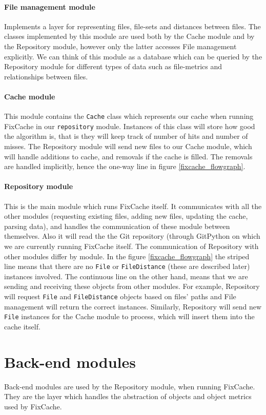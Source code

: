 \documentclass[12pt,twoside,notitlepage]{report}
\newcommand{\fxch}{FixCache}
\begin{document}
\paragraph{File management module}Implements a layer for representing files, file-sets and distances between files. The classes implemented by this module are used both by the Cache module and by the Repository module, however only the latter accesses File management explicitly. We can think of this module as a database which can be queried by the Repository module for different types of data such as file-metrics and relationships between files.

\paragraph{Cache module}This module contains the \texttt{Cache} class which represents our cache when running \fxch{} in our \texttt{repository} module. Instances of this class will store how good the algorithm is, that is they will keep track of number of hits and number of misses. The Repository module will send new files to our Cache module, which will handle additions to cache, and removals if the cache is filled. The removals are handled implicitly, hence the one-way line in figure \ref{fixcache_flowgraph}.

\paragraph{Repository module}This is the main module which runs \fxch{} itself. It communicates with all the other modules (requesting existing files, adding new files, updating the cache, parsing data), and handles the communication of these module between themselves. Also it will read the the Git repository (through GitPython on which we are currently running \fxch{} itself. The communication of Repository with other modules differ by module. In the figure \ref{fixcache_flowgraph} the striped line means that there are no \texttt{File} or \texttt{FileDistance} (these are described later) instances involved. The continuous line on the other hand, means that we are sending and receiving these objects from other modules. For example, Repository will request \texttt{File} and \texttt{FileDistance} objects based on files' paths and File management will return the correct instances. Similarly, Repository will send new \texttt{File} instances for the Cache module to process, which will insert them into the cache itself.
\clearpage
\section{Back-end modules} Back-end modules are used by the Repository module, when running \fxch{}. They are the layer which handles the abstraction of objects and object metrics used by \fxch{}.
\end{document}
